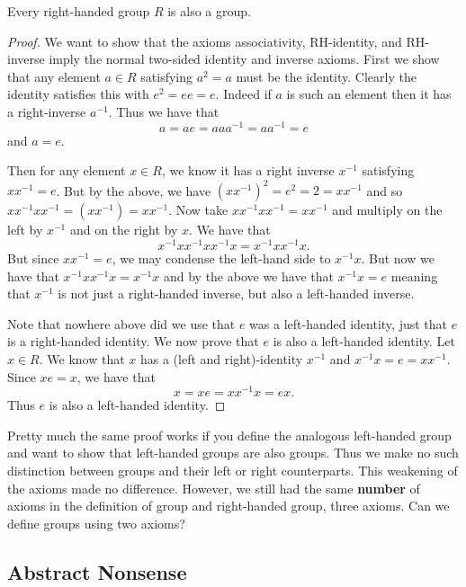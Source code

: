 \documentclass{article}
\begin{document}
\begin{theorem}
  Every right-handed group $R$ is also a group.
\end{theorem}
\begin{proof}
  We want to show that the axioms associativity, RH-identity, and RH-inverse imply the normal two-sided identity and inverse axioms.
  First we show that any element $a \in R$ satisfying $a^{2} = a$ must be the identity.
  Clearly the identity satisfies this with $e^{2} = ee = e$.
  Indeed if $a$ is such an element then it has a right-inverse $a^{-1}$.
  Thus we have that
  \[
    a = ae = a a a^{-1} = a a^{-1} = e
  \]
  and $a = e$.

  Then for any element $x \in R$, we know it has a right inverse $x^{-1}$ satisfying $x x^{-1} = e$.
  But by the above, we have $\left(x x^{-1}\right)^{2} = e^{2} = 2 = x x^{-1}$ and so $x x^{-1} x x^{-1} = \left( x x^{-1} \right) = x x^{-1}$.
  Now take $x x^{-1} x x^{-1} = x x^{-1}$ and multiply on the left by $x^{-1}$ and on the right by $x$.
  We have that
  \[
    x^{-1} x x^{-1} x x^{-1} x = x^{-1} x x^{-1} x.
  \]
  But since $x x^{-1} = e$, we may condense the left-hand side to $x^{-1} x$.
  But now we have that $x^{-1} x x^{-1} x = x^{-1} x$ and by the above we have that $x^{-1} x = e$ meaning that $x^{-1}$ is not just a right-handed inverse, but also a left-handed inverse.

  Note that nowhere above did we use that $e$ was a left-handed identity, just that $e$ is a right-handed identity.
  We now prove that $e$ is also a left-handed identity.
  Let $x \in R$.
  We know that $x$ has a (left and right)-identity $x^{-1}$ and $x^{-1} x = e = x x^{-1}$.
  Since $x e = x$, we have that
  \[
    x = x e = x x^{-1} x = e x.
  \]
  Thus $e$ is also a left-handed identity.
\end{proof}

Pretty much the same proof works if you define the analogous left-handed group and want to show that left-handed groups are also groups.
Thus we make no such distinction between groups and their left or right counterparts.
This weakening of the axioms made no difference.
However, we still had the same \textbf{number} of axioms in the definition of group and right-handed group, three axioms.
Can we define groups using two axioms?

\subsection*{Abstract Nonsense}
\end{document}
